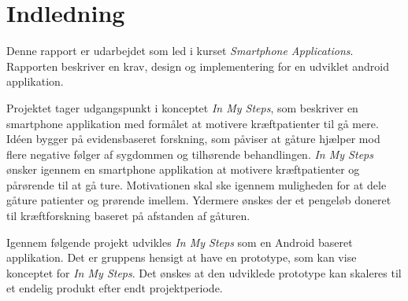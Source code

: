 \thispagestyle{fancy}
\chapter{Indledning}
\label{chp:indledning}

Denne rapport er udarbejdet som led i kurset \emph{Smartphone Applications}. Rapporten beskriver en krav, design og implementering for en udviklet android applikation.

Projektet tager udgangspunkt i konceptet \emph{In My Steps}, som beskriver en smartphone applikation med formålet at motivere kræftpatienter til gå mere. Idéen bygger på evidensbaseret forskning, som påviser at gåture hjælper mod flere negative følger af sygdommen og tilhørende behandlingen. 
\emph{In My Steps} ønsker igennem en smartphone applikation at motivere kræftpatienter og pårørende til at gå ture. Motivationen skal ske igennem muligheden for at dele gåture patienter og prørende imellem. Ydermere ønskes der et pengeløb doneret til kræftforskning baseret på afstanden af gåturen.

Igennem følgende projekt udvikles \emph{In My Steps} som en Android baseret applikation. Det er gruppens hensigt at have en prototype, som kan vise konceptet for \emph{In My Steps}. Det ønskes at den udviklede prototype kan skaleres til et endelig produkt efter endt projektperiode.

